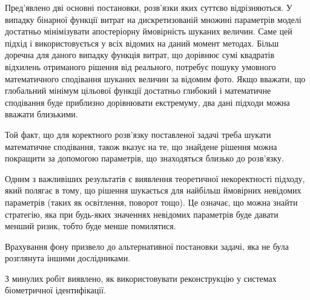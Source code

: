 \chapterConclusion

Пред'явлено дві основні постановки, розв'язки яких суттєво відрізняються.
У випадку бінарної функції витрат на дискретизованій множині параметрів моделі
достатньо мінімізувати апостеріорну ймовірність шуканих величин.
Саме цей підхід і використовується у всіх відомих на даний момент методах.
Більш доречна для даного випадку функція витрат,
що дорівнює сумі квадратів відхилень отриманого рішення від реального,
потребує пошуку умовного математичного сподівання
шуканих величин за відомим фото.
Якщо вважати,
що глобальний мінімум цільової функції достатньо глибокий
і математичне сподівання буде приблизно дорівнювати екстремуму,
два дані підходи можна вважати близькими.

Той факт,
що для коректного розв'язку поставленої задачі треба шукати
математичне сподівання,
також вказує на те,
що знайдене рішення можна покращити за допомогою параметрів,
що знаходяться близько до розв'язку.

Одним з важливіших результатів є виявлення теоретичної некоректності підходу,
який полягає в тому,
що рішення шукається для найбільш ймовірних невідомих параметрів
(таких як освітлення, поворот тощо).
Це означає, що можна знайти стратегію,
яка при будь-яких значеннях невідомих параметрів буде давати менший ризик,
тобто буде менше помилятися.

Врахування фону призвело до альтернативної постановки задачі,
яка не була розглянута іншими дослідниками.

З минулих робіт виявлено,
як використовувати реконструкцію у системах біометричної ідентифікації.
